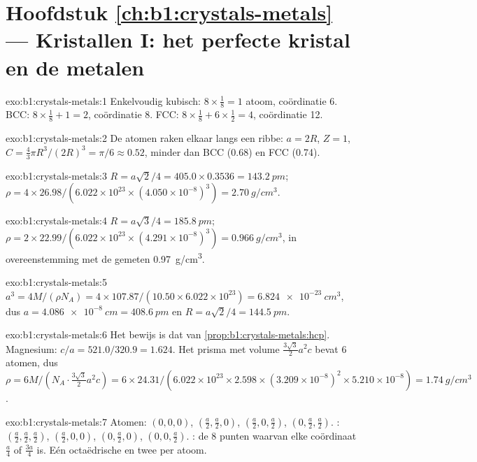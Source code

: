 \section*{Hoofdstuk \ref{ch:b1:crystals-metals} --- Kristallen I: het perfecte kristal en de metalen}

\begin{solution}{exo:b1:crystals-metals:1}
Enkelvoudig kubisch: $8 \times \frac18 = 1$ atoom, coördinatie 6. BCC: $8 \times
\frac18 + 1 = 2$, coördinatie 8. FCC: $8 \times \frac18 + 6 \times
\frac12 = 4$, coördinatie 12.
\end{solution}

\begin{solution}{exo:b1:crystals-metals:2}
De atomen raken elkaar langs een ribbe: $a = 2R$, $Z = 1$, $C = \frac43\pi R^3/(2R)^3
= \pi/6 \approx 0.52$, minder dan BCC (0.68) en FCC (0.74).
\end{solution}

\begin{solution}{exo:b1:crystals-metals:3}
$R = a\sqrt2/4 = 405.0 \times 0.3536 = \qty{143.2}{pm}$;
$\rho = 4 \times 26.98/(6.022 \times 10^{23} \times (4.050 \times
10^{-8})^3) = \qty{2.70}{g/cm^3}$.
\end{solution}

\begin{solution}{exo:b1:crystals-metals:4}
$R = a\sqrt3/4 = \qty{185.8}{pm}$; $\rho = 2 \times 22.99/(6.022 \times
10^{23} \times (4.291 \times 10^{-8})^3) = \qty{0.966}{g/cm^3}$, in
overeenstemming met de gemeten \qty{0.97}{g/cm^3}.
\end{solution}

\begin{solution}{exo:b1:crystals-metals:5}
$a^3 = 4M/(\rho N_A) = 4 \times 107.87/(10.50 \times 6.022 \times 10^{23}) =
\qty{6.824e-23}{cm^3}$, dus $a = \qty{4.086e-8}{cm} = \qty{408.6}{pm}$ en
$R = a\sqrt2/4 = \qty{144.5}{pm}$.
\end{solution}

\begin{solution}{exo:b1:crystals-metals:6}
Het bewijs is dat van \cref{prop:b1:crystals-metals:hcp}. Magnesium:
$c/a = 521.0/320.9 = 1.624$. Het prisma met volume
$\frac{3\sqrt3}{2}a^2c$ bevat 6 atomen, dus $\rho = 6M/(N_A \cdot
\frac{3\sqrt3}{2}a^2c) = 6 \times 24.31/(6.022 \times 10^{23} \times
2.598 \times (3.209 \times 10^{-8})^2 \times 5.210 \times 10^{-8}) =
\qty{1.74}{g/cm^3}$.
\end{solution}

\begin{solution}{exo:b1:crystals-metals:7}
Atomen: $(0,0,0)$, $(\frac a2,\frac a2,0)$, $(\frac a2,0,\frac a2)$,
$(0,\frac a2,\frac a2)$. : $(\frac a2,\frac a2,\frac a2)$,
$(\frac a2,0,0)$, $(0,\frac a2,0)$, $(0,0,\frac a2)$. :
de 8 punten waarvan elke coördinaat $\frac a4$ of $\frac{3a}{4}$ is. Eén
octaëdrische en twee  per atoom.
\end{solution}

